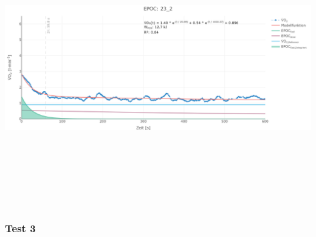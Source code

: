 \documentclass[
  letterpaper,
  DIV=11]{scrartcl}
\begin{document}
\includegraphics[width=11.45833in,height=4.6875in]{images/23_2.png}

\subsubsection{Test 3}
\end{document}
